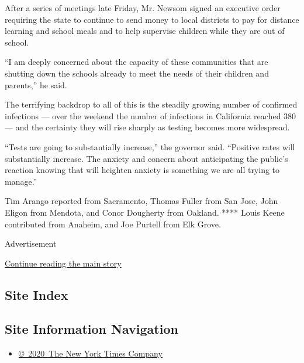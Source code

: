 After a series of meetings late Friday, Mr. Newsom signed an executive
order requiring the state to continue to send money to local districts
to pay for distance learning and school meals and to help supervise
children while they are out of school.

``I am deeply concerned about the capacity of these communities that are
shutting down the schools already to meet the needs of their children
and parents,'' he said.

The terrifying backdrop to all of this is the steadily growing number of
confirmed infections --- over the weekend the number of infections in
California reached 380 --- and the certainty they will rise sharply as
testing becomes more widespread.

``Tests are going to substantially increase,'' the governor said.
``Positive rates will substantially increase. The anxiety and concern
about anticipating the public's reaction knowing that will heighten
anxiety is something we are all trying to manage.''

Tim Arango reported from Sacramento, Thomas Fuller from San Jose, John
Eligon from Mendota, and Conor Dougherty from Oakland. **** Louis Keene
contributed from Anaheim, and Joe Purtell from Elk Grove.

Advertisement

\protect\hyperlink{after-bottom}{Continue reading the main story}

\hypertarget{site-index}{%
\subsection{Site Index}\label{site-index}}

\hypertarget{site-information-navigation}{%
\subsection{Site Information
Navigation}\label{site-information-navigation}}

\begin{itemize}
\tightlist
\item
  \href{https://help.nytimes3xbfgragh.onion/hc/en-us/articles/115014792127-Copyright-notice}{©~2020~The
  New York Times Company}
\end{itemize}

